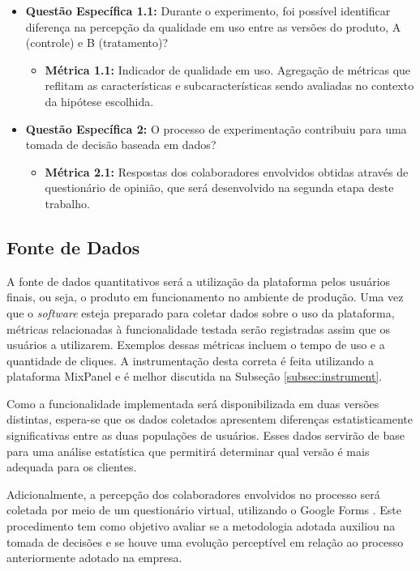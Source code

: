 \begin{itemize}
    \item \textbf{Questão Específica 1.1:}  Durante o experimento, foi possível identificar diferença na percepção da qualidade em uso entre as versões do produto, A (controle) e B (tratamento)?
    \begin{itemize}
        \item \textbf{Métrica 1.1:} Indicador de qualidade em uso. Agregação de métricas que reflitam as características e subcaracterísticas sendo avaliadas no contexto da hipótese escolhida.
    \end{itemize}
  
    \item\textbf{Questão Específica 2:} O processo de experimentação contribuiu para uma tomada de decisão baseada em dados?

    \begin{itemize}
        \item\textbf{Métrica 2.1:} Respostas dos colaboradores envolvidos obtidas através de questionário de opinião, que será desenvolvido na segunda etapa deste trabalho.
    \end{itemize}
    
\end{itemize}

\subsection{Fonte de Dados}

A fonte de dados quantitativos será a utilização da plataforma pelos usuários finais, ou seja, o produto em funcionamento no ambiente de produção. Uma vez que o \textit{software} esteja preparado para coletar dados sobre o uso da plataforma, métricas relacionadas à funcionalidade testada serão registradas assim que os usuários a utilizarem. Exemplos dessas métricas incluem o tempo de uso e a quantidade de cliques. A instrumentação desta correta é feita utilizando a plataforma MixPanel e é melhor discutida na Subseção \ref{subsec:instrument}.

Como a funcionalidade implementada será disponibilizada em duas versões distintas, espera-se que os dados coletados apresentem diferenças estatisticamente significativas entre as duas populações de usuários. Esses dados servirão de base para uma análise estatística que permitirá determinar qual versão é mais adequada para os clientes.

Adicionalmente, a percepção dos colaboradores envolvidos no processo será coletada por meio de um questionário virtual, utilizando o Google Forms \cite{forms}. Este procedimento tem como objetivo avaliar se a metodologia adotada auxiliou na tomada de decisões e se houve uma evolução perceptível em relação ao processo anteriormente adotado na empresa.
